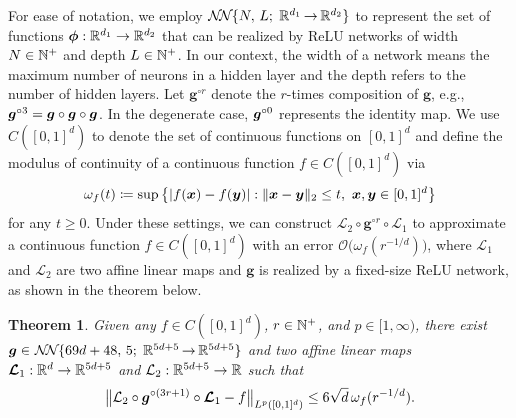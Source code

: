 \documentclass[nohyperref]{article}
\theoremstyle{plain}
\newtheorem{theorem}{Theorem}[section]
\theoremstyle{definition}
\theoremstyle{remark}
\begin{document}
For ease of notation, we employ $\nn{N}{L}{d_1}{d_2}$ to represent the set of functions $\bmphi:\R^{d_1}\to\R^{d_2}$ that can be
realized by ReLU networks of width $N\in \N^+$ and depth $L\in \N^+$. In our context, the width of a network means the maximum number of neurons in a hidden layer
and the depth refers to the number of hidden layers.
Let $\bm{g}^{\circ r}$ denote the $r$-times composition of $\bm{g}$, e.g., ${\bm{g}}^{\circ 3}={\bm{g}}\circ {\bm{g}}\circ {\bm{g}}$. In the degenerate case, ${\bm{g}}^{\circ 0}$ 
represents
the identity map.
We use $C([0,1]^d)$ to denote the set of continuous functions on $[0,1]^d$ and define the modulus of continuity of a continuous function $f\in C([0,1]^d)$ via
{\fontsize{9.5}{12}\selectfont
\begin{equation*}
	\omega_f(t)\coloneqq \sup\big\{|f({\bm{x}})-f({\bm{y}})|: \|{\bm{x}}-{\bm{y}}\|_2\le t,\ {\bm{x}},{\bm{y}}\in [0,1]^d\big\}
\end{equation*}}for any $t\ge0$.
Under these settings, we can construct 
$\mathcal{L}_2\circ \bm{g}^{\circ r}\circ \bm{\mathcal{L}}_1$ to approximate a continuous function $f\in C([0,1]^d)$ with an error $\mathcal{O}\big(\omega_f(r^{-1/d})\big)$, where $\bm{\mathcal{L}}_1$ and $\mathcal{L}_2$ are two affine linear maps and $\bm{g}$ is realized by a fixed-size ReLU network, as shown in the theorem below.

\begin{theorem}
	\label{thm:main:Lp}
	Given  any $f\in C([0,1]^d)$, $r\in \N^+$, and $p\in [1,\infty)$,
	there exist $\bmg\in \nn{69d+48}{5}{5d+5}{5d+5}$
	and two affine linear maps
	$\bmcalL_1:\R^d\to\R^{5d+5}$ and $\calL_2:\R^{5d+5}\to\R$
	such that 
	\begin{equation*}
		\big\|{\mathcal{L}}_2\circ {\bm{g}}^{\circ (3r+1)}\circ {\bm{\mathcal{L}}}_1-f\big\|_{L^p([0,1]^d)}\le 6\sqrt{d}\,\omega_f(r^{-1/d}).
	\end{equation*}
\end{theorem}
\end{document}
